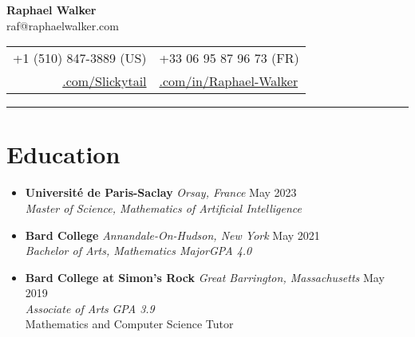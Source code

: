 \documentclass[12pt,letterpaper]{article}
\begin{document}
\begin{center}
	{\LARGE{\textbf{Raphael Walker}}}\\[0.05in]
        raf@raphaelwalker.com\\[0.04in]
	\begin{tabular}{r @{\hskip 0.1in}|@{\hskip 0.1in} l}
        +1 (510) 847-3889 (US) & +33 06 95 87 96 73 (FR)\\
		\href{https://github.com/Slickytail}{\faGithub.com/Slickytail} &
		\href{https://linkedin.com/in/raphael-walker}{\faLinkedinSquare.com/in/Raphael-Walker}
	\end{tabular}
\end{center}
\hrule \vspace{-0.5em}

\section*{Education} \vspace{-0.5em}
\begin{itemize}[label=,itemsep=0pt]
    \item
    \textbf{Université de Paris-Saclay} \textit{Orsay, France} \hfill May 2023\\
    \textit{Master of Science, Mathematics of Artificial Intelligence}
	\item
	\textbf{Bard College} \textit{Annandale-On-Hudson, New York} \hfill May 2021\\
    \textit{Bachelor of Arts, Mathematics Major}\hfill \textit{GPA 4.0}
	\item
	\textbf{Bard College at Simon's Rock} \textit{Great Barrington, Massachusetts} \hfill May 2019\\
	\textit{Associate of Arts} \hfill \textit{GPA 3.9}\\
	Mathematics and Computer Science Tutor
\end{itemize}
\vspace{-2em}
\end{document}

